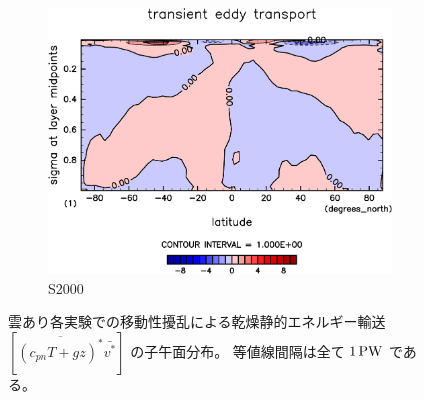 \documentclass[body]{subfiles}
\begin{document}
\begin{figure}[t]
\begin{subfigure}{.4\textwidth}
		\centering
		\includegraphics[width=\textwidth]{S2000/MeriHeatTransTest@dryStatEn_TE,time=7300:7665-crop-rotate.pdf}
		\caption{S2000}\label{乾燥静的エネルギー移動性擾乱S2000}
	\end{subfigure}
	\caption[雲あり各実験での移動性擾乱に依る乾燥静的エネルギー輸送の子午面分布]{
		雲あり各実験での移動性擾乱による乾燥静的エネルギー輸送 \([\overline{(c_{pn}T+gz)^*}\bar{v^*}]\) の子午面分布。
		等値線間隔は全て \(1\hmu{PW}\) である。
	}\label{乾燥静的エネルギー移動性擾乱}
\end{figure}
\end{document}
